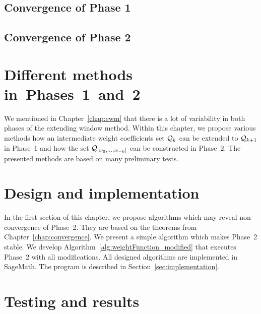 	\section{Convergence of Phase 1}
	

	\section{Convergence of Phase 2}
	
	

	


\chapter{Different methods in~Phases~1~and~2}
	\label{chap:diffChoices}
	We mentioned in Chapter~\ref{chap:ewm} that there is a lot of variability in both phases of the extending window method. Within this chapter, we propose various methods how an intermediate weight coefficients set $\mathcal{Q}_k$ can be extended to $\mathcal{Q}_{k+1}$ in Phase~1 and how the set $\mathcal{Q}_{[w_{0}, \dots, w_{-k}]}$ can be constructed in Phase~2. The presented methods are based on many preliminary tests.

	

	

	
	


\chapter{Design and implementation}

In the first section of this chapter, we propose algorithms which may reveal non-convergence of Phase~2. They are based on the theorems from Chapter~\ref{chap:convergence}. We present a simple algorithm which makes Phase~2 stable. We develop Algorithm~\ref{alg:weightFunction_modified} that executes  Phase~2 with all modifications. All designed algorithms are implemented in SageMath. The program is described in Section~\ref{sec:implementation}.
\label{chap:design}
	
	

\chapter{Testing and results}
\label{chap:testing}
	


\cleardoublepage{}
{}
